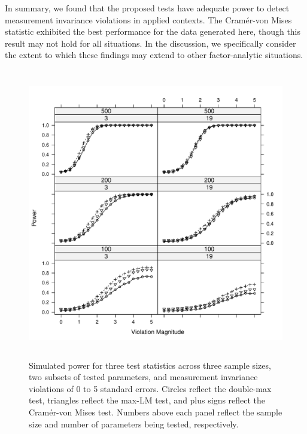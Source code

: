 \documentclass[man]{apa}
\begin{document}
In summary, we found that the proposed tests have adequate power to detect
measurement invariance violations in applied contexts.  The 
Cram\'{e}r-von Mises statistic exhibited the best performance for the
data generated here, though this result may not hold for all
situations.  In the discussion, we specifically consider the extent to 
which these findings may extend to other factor-analytic situations.

\begin{figure}
\caption{Simulated power for three test statistics across three sample
  sizes, two subsets of tested parameters, and measurement invariance
  violations of 0 to 5 standard 
  errors.  Circles reflect the double-max test, triangles reflect the
  max-LM test, and plus signs reflect the Cram\'{e}r-von Mises test.
  Numbers above each panel reflect the sample size and number of
  parameters being tested, respectively.}
\label{fig:simres}
\includegraphics[height=5in]{simres.pdf}
\end{figure}
\end{document}
